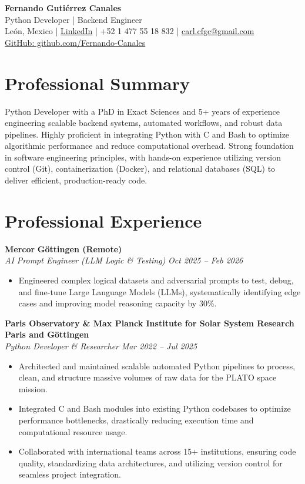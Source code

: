 \documentclass[10pt,a4paper]{article}
\begin{document}
\begin{center}
    {\Huge \textbf{Fernando Gutiérrez Canales}}\\
    {\Large Python Developer | Backend Engineer}\\    
    León, Mexico \quad | \quad \href{https://www.linkedin.com/in/fernando-guti\%C3\%A9rrez-canales-804876343/}{LinkedIn} \quad | \quad +52 1 477 55 18 832 \quad | \quad \href{mailto:carl.cfgc@gmail.com}{carl.cfgc@gmail.com} \\
     \href{https://github.com/Fernando-Canales}{GitHub: github.com/Fernando-Canales}
\end{center}

\vspace{1em}

\section*{Professional Summary}
Python Developer with a PhD in Exact Sciences and 5+ years of experience engineering scalable backend systems, automated workflows, and robust data pipelines. Highly proficient in integrating Python with C and Bash to optimize algorithmic performance and reduce computational overhead. Strong foundation in software engineering principles, with hands-on experience utilizing version control (Git), containerization (Docker), and relational databases (SQL) to deliver efficient, production-ready code.

\section*{Professional Experience}
\textbf{Mercor} \hfill \textbf{Göttingen (Remote)} \\
\textit{AI Prompt Engineer (LLM Logic \& Testing)} \hfill \textit{Oct 2025 -- Feb 2026}
\begin{itemize}[leftmargin=1.5em]
	\item Engineered complex logical datasets and adversarial prompts to test, debug, and fine-tune Large Language Models (LLMs), systematically identifying edge cases and improving model reasoning capacity by 30\%.
\end{itemize}

\textbf{Paris Observatory \& Max Planck Institute for Solar System Research} \hfill \textbf{Paris and Göttingen} \\
\textit{Python Developer \& Researcher} \hfill \textit{Mar 2022 -- Jul 2025}
\begin{itemize}[leftmargin=1.5em]
    \item Architected and maintained scalable automated Python pipelines to process, clean, and structure massive volumes of raw data for the PLATO space mission.
    \item Integrated C and Bash modules into existing Python codebases to optimize performance bottlenecks, drastically reducing execution time and computational resource usage.
    \item Collaborated with international teams across 15+ institutions, ensuring code quality, standardizing data architectures, and utilizing version control for seamless project integration.
\end{itemize}
\end{document}
